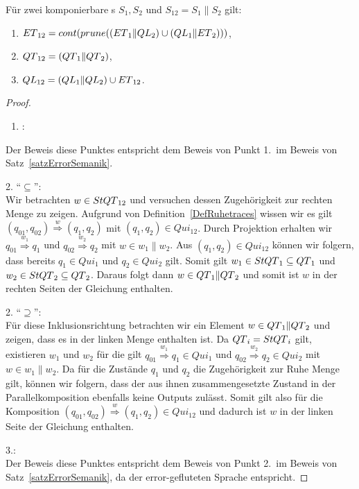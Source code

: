 \begin{satz}
  \label{satzQuiSemantik}
  Für zwei komponierbare \EIO{}s $S_1, S_2$ und $S_{12} = S_1\|S_2$ gilt:
  \begin{enumerate}
    \item $ET{}_{12} = cont{}(prune{}((ET{}_1\|QL{}_2)\cup (QL{}_1\|ET{}_2)))$,
    \item $QT{}_{12} = (QT{}_1\|QT{}_2)$,
    \item $QL{}_{12} = (QL{}_1\|QL{}_2)\cup ET{}_{12}$.
  \end{enumerate}
\end{satz}

\begin{proof}
  ~
  \begin{enumerate}
    \item \hspace{-0.2cm}:
  \end{enumerate}
  \vspace{-0.3cm}
  Der Beweis diese Punktes entspricht dem Beweis von Punkt 1.\ im Beweis von
  Satz~\ref{satzErrorSemanik}.

  2. ``$\subseteq$'':\\
  Wir betrachten $w\in StQT{}_{12}$ und versuchen dessen
  Zugehörigkeit zur rechten Menge zu zeigen. Aufgrund von
  Definition~\ref{DefRuhetraces} wissen wir es gilt $(q_{01},q_{02})
  \overset{w}{\Rightarrow} (q_1,q_2)$ mit $(q_1,q_2)\in Qui_{12}$. Durch
  Projektion erhalten wir $q_{01} \overset{w_1}{\Rightarrow} q_1$ und $q_{02}
  \overset{w_2}{\Rightarrow} q_2$ mit $w\in w_1\|w_2$. Aus $(q_1,q_2)\in
  Qui_{12}$ können wir folgern, dass bereits $q_1\in Qui_1$ und $q_2\in
  Qui_2$ gilt. Somit gilt $w_1\in StQT{}_1\subseteq QT{}_1$ und $w_2\in
  StQT{}_2\subseteq QT{}_2$. Daraus folgt dann $w\in QT{}_1\|QT{}_2$ und somit ist $w$
  in der rechten Seiten der Gleichung enthalten.

  2. ``$\supseteq$'':\\
  Für diese Inklusionsrichtung betrachten wir ein Element $w\in QT{}_1\|QT{}_2$ und
  zeigen, dass es in der linken Menge enthalten ist. Da $QT{}_i = StQT{}_i$ gilt,
  existieren $w_1$ und $w_2$ für die gilt $q_{01} \overset{w_1}{\Rightarrow}
  q_1\in Qui_1$ und $q_{02} \overset{w_2}{\Rightarrow} q_2\in Qui_2$ mit $w\in
  w_1\| w_2$. Da für die Zustände $q_1$ und $q_2$ die Zugehörigkeit zur
  Ruhe Menge gilt, können wir folgern, dass der aus ihnen zusammengesetzte
  Zustand in der Parallelkomposition ebenfalls keine Outputs zulässt. Somit
  gilt also für die Komposition $(q_{01},q_{02}) \overset{w}{\Rightarrow}
  (q_1,q_2)\in Qui_{12}$ und dadurch ist $w$ in der linken Seite der Gleichung
  enthalten.

  3.:\\
  Der Beweis diese Punktes entspricht dem Beweis von Punkt 2.\ im Beweis von
  Satz~\ref{satzErrorSemanik}, da \QL{} der error-gefluteten Sprache \EL{}
  entspricht.
\end{proof}

